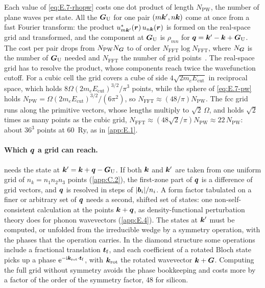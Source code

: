 Each value of \cref{eq:E.7-rhopw} costs one dot product of length $N_{\mathrm{PW}}$, the number of plane waves per state. All the $\bm{G}_{\mathrm{U}}$ for one pair $(m\bm{k}', n\bm{k})$ come at once from a fast Fourier transform: the product $u^*_{m\bm{k}'}(\bm{r})\,u_{n\bm{k}}(\bm{r})$ is formed on the real-space grid and transformed, and the component at $\bm{G}_{\mathrm{U}}$ is $\rho_{mn}$ for $\bm{q} = \bm{k}' - \bm{k} + \bm{G}_{\mathrm{U}}$. The cost per pair drops from $N_{\mathrm{PW}}N_{\bm{G}}$ to of order $N_{\mathrm{FFT}}\log N_{\mathrm{FFT}}$, where $N_{\bm{G}}$ is the number of $\bm{G}_{\mathrm{U}}$ needed and $N_{\mathrm{FFT}}$ the number of grid points~\cite[below Eq.~(3.15)]{griffin2021extended}. The real-space grid has to resolve the product, whose components reach twice the wavefunction cutoff. For a cubic cell the grid covers a cube of side $4\sqrt{2m_eE_{\mathrm{cut}}}$ in reciprocal space, which holds $8\Omega(2m_eE_{\mathrm{cut}})^{3/2}/\pi^3$ points, while the sphere of \cref{eq:E.7-pw} holds $N_{\mathrm{PW}} = \Omega(2m_eE_{\mathrm{cut}})^{3/2}/(6\pi^2)$, so $N_{\mathrm{FFT}} \approx (48/\pi)N_{\mathrm{PW}}$. The fcc grid runs along the primitive vectors, whose lengths multiply to $\sqrt2\,\Omega$, and holds $\sqrt2$ times as many points as the cubic grid, $N_{\mathrm{FFT}} \approx (48\sqrt2/\pi)N_{\mathrm{PW}} \approx 22\,N_{\mathrm{PW}}$: about $36^3$ points at \SI{60}{Ry}, as in \cref{app:E.1}.

\paragraph{Which $\bm{q}$ a grid can reach.}  needs the state at $\bm{k}' = \bm{k}+\bm{q} - \bm{G}_{\mathrm{U}}$. If both $\bm{k}$ and $\bm{k}'$ are taken from one uniform grid of $n_k = n_1n_2n_3$ points (\cref{app:C.2}), the first-zone part of $\bm{q}$ is a difference of grid vectors, and $\bm{q}$ is resolved in steps of $|\bm{b}_i|/n_i$. A form factor tabulated on a finer or arbitrary set of $\bm{q}$ needs a second, shifted set of states: one non-self-consistent calculation at the points $\bm{k}+\bm{q}$, as density-functional perturbation theory does for phonon wavevectors (\cref{app:E.4}). The states at $\bm{k}'$ must be computed, or unfolded from the irreducible wedge by a symmetry operation, with the phases that the operation carries. In the diamond structure some operations include a fractional translation $\bm{t}_{\mathrm{f}}$, and each coefficient of a rotated Bloch state picks up a phase $\mathrm{e}^{-\mathrm{i}\bm{k}_{\mathrm{rot}}\cdot\bm{t}_{\mathrm{f}}}$, with $\bm{k}_{\mathrm{rot}}$ the rotated wavevector $\bm{k}+\bm{G}$. Computing the full grid without symmetry avoids the phase bookkeeping and costs more by a factor of the order of the symmetry factor, 48 for silicon.

